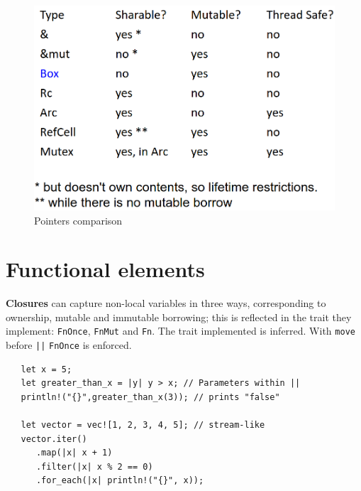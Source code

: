 \begin{figure}[htbp]
   \centering
   \includegraphics{images/smartpointers.png}
   \caption{Pointers comparison}
   \label{fig:smartpointers}
\end{figure}

\newpage
\section{Functional elements}

\textbf{Closures} can capture non-local variables in three ways,
corresponding to ownership, mutable and immutable
borrowing; 
this is reflected in the trait they implement: \lstinline|FnOnce|,
\lstinline|FnMut| and \lstinline|Fn|.
The trait implemented is inferred.
With \lstinline|move| before \lstinline{||} \lstinline|FnOnce| is enforced.
\begin{lstlisting}
   let x = 5;
   let greater_than_x = |y| y > x; // Parameters within ||
   println!("{}",greater_than_x(3)); // prints "false"
   
   let vector = vec![1, 2, 3, 4, 5]; // stream-like
   vector.iter()
      .map(|x| x + 1)
      .filter(|x| x % 2 == 0)
      .for_each(|x| println!("{}", x));
\end{lstlisting}

\newpage
